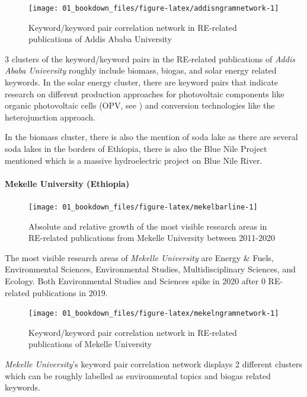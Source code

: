 \documentclass[
]{book}
\begin{document}
\begin{figure}
\texttt{[image: 01\_bookdown\_files/figure-latex/addisngramnetwork-1]} \caption{Keyword/keyword pair correlation network in RE-related publications of Addis Ababa University}\label{fig:addisngramnetwork}
\end{figure}

3 clusters of the keyword/keyword pairs in the RE-related publications of \emph{Addis Ababa University} roughly include biomass, biogas, and solar energy related keywords. In the solar energy cluster, there are keyword pairs that indicate research on different production approaches for photovoltaic components like organic photovoltaic cells (OPV, see \citet{rwenyagila2017}) and conversion technologies like the heterojunction approach.

In the biomass cluster, there is also the mention of soda lake as there are several soda lakes in the borders of Ethiopia, there is also the Blue Nile Project mentioned which is a massive hydroelectric project on Blue Nile River.

\hypertarget{mekelle-university-ethiopia}{%
\paragraph{Mekelle University (Ethiopia)}\label{mekelle-university-ethiopia}}

\begin{figure}
\texttt{[image: 01\_bookdown\_files/figure-latex/mekelbarline-1]} \caption{Absolute and relative growth of the most visible research areas in RE-related publications from Mekelle University between 2011-2020}\label{fig:mekelbarline}
\end{figure}

The most visible research areas of \emph{Mekelle University} are Energy \& Fuels, Environmental Sciences, Environmental Studies, Multidisciplinary Sciences, and Ecology.
Both Environmental Studies and Sciences spike in 2020 after 0 RE-related publications in 2019.

\begin{figure}
\texttt{[image: 01\_bookdown\_files/figure-latex/mekelngramnetwork-1]} \caption{Keyword/keyword pair correlation network in RE-related publications of Mekelle University}\label{fig:mekelngramnetwork}
\end{figure}

\emph{Mekelle University}'s keyword pair correlation network displays 2 different clusters which can be roughly labelled as environmental topics and biogas related keywords.
\end{document}
